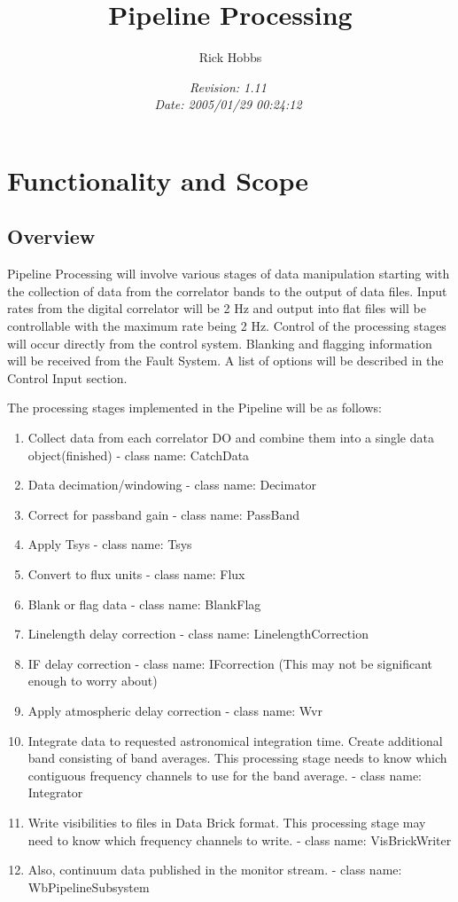 \documentclass[11pt]{article}
\begin{document}
\title{Pipeline Processing}
\author{Rick Hobbs}
\date {\it $ $Revision: 1.11 $ $ \\ $ $Date: 2005/01/29 00:24:12 $ $}
\maketitle


%
%
\section{Functionality and Scope}
%
%
\subsection{Overview}
%
%
Pipeline Processing will involve various stages of data manipulation starting
with the collection of data from the correlator bands to the output of
data files. Input rates from the digital
correlator will be 2 Hz and output into flat files
will be controllable with the maximum rate being 2 Hz.
Control of the processing stages will occur directly from the control
system. Blanking and flagging information will be received from the Fault
System.
A list of options will be described in the Control Input section.

The processing stages implemented in the Pipeline will be as follows:
\begin{enumerate}
\item
Collect data from each correlator DO and combine them into a single data
object(finished) - class name: CatchData
\item
Data decimation/windowing - class name: Decimator
\item
Correct for passband gain - class name: PassBand
\item
Apply Tsys - class name: Tsys
\item
Convert to flux units - class name: Flux
\item
Blank or flag data - class name: BlankFlag
\item
Linelength delay correction - class name: LinelengthCorrection
\item
IF delay correction - class name: IFcorrection
(This may not be significant enough to worry about)
\item
Apply atmospheric delay correction - class name: Wvr
\item
Integrate data to requested astronomical integration time. Create additional
band consisting of band averages. This processing stage needs to know which
contiguous frequency channels to use for the band average. 
- class name: Integrator
\item
Write visibilities to files in Data Brick format. This processing stage may
need to know which frequency channels to write. - class name: VisBrickWriter
\item
Also, continuum data published in the monitor stream. - class name: 
WbPipelineSubsystem
\end{enumerate}
\end{document}
